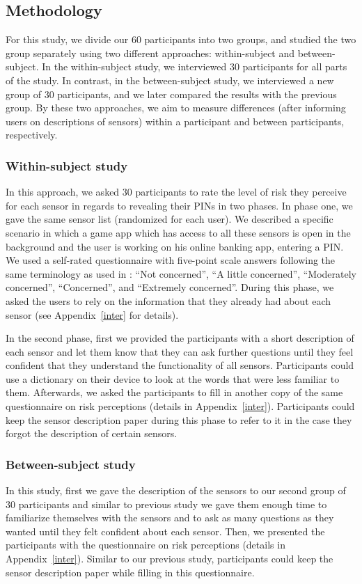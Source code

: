 \documentclass[10pt,twocolumn]{article}
\begin{document}
\subsection{Methodology}
For this study, we divide our 60 participants into two groups, and studied the two group separately using two different approaches: within-subject and between-subject.
In the within-subject study, we interviewed 30 participants for all parts of the study. In contrast, in the between-subject study, we interviewed a new group of 30 participants, and we later compared the results with the previous group. By these two approaches, we aim to measure differences (after informing users on descriptions of sensors) within a participant and between participants, respectively.

\subsubsection{Within-subject study}
In this approach, we asked 30 participants to rate the level of risk they perceive for each sensor in regards to revealing their PINs in two phases. In phase one, we gave the same sensor list (randomized for each user). 
We described a specific scenario in which a game app which has access to all these sensors is open in the background and the user is working on his online banking app, entering a PIN. 
We used a self-rated questionnaire with five-point scale answers following the same terminology as used in \cite{Raij}: ``Not concerned'', ``A little concerned'', ``Moderately concerned'', ``Concerned'', and ``Extremely concerned''.
During this phase, we asked the users to rely on the information that they already had about each sensor (see Appendix~\ref{inter} for details).

In the second phase, first we provided the participants with a short description of each sensor and let them know that they can ask further questions until they feel confident that they understand the functionality of all sensors. Participants could use a dictionary on their device to look at the words that were less familiar to them. 
Afterwards, we asked the participants to fill in another copy of the same questionnaire on risk perceptions (details in Appendix~\ref{inter}). Participants could keep the sensor description paper during this phase to refer to it in the case they forgot the description of certain sensors.  

\subsubsection{Between-subject study}
In this study, first we gave the description of the sensors to our second group of 30 participants and similar to previous study we gave them enough time to familiarize themselves with the sensors and to ask as many questions as they wanted until they felt confident about each sensor.  Then, we presented the participants with the questionnaire on risk perceptions (details in Appendix~\ref{inter}). Similar to our previous study, participants could keep the sensor description paper while filling in this questionnaire.  
\end{document}

